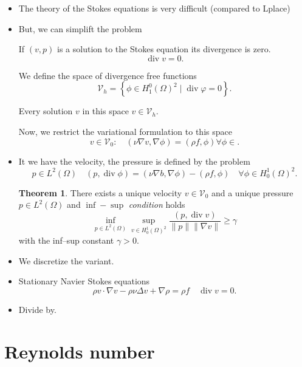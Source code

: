 \documentclass[
	a4paper,
	11pt,
	oneside
]{scrreprt}
\theoremstyle{definition}
\newtheorem{theorem}{Theorem}
\renewcommand{\div}{\operatorname{div}}
\begin{document}
\begin{itemize}
\item The theory of the Stokes equations is very difficult (compared to Lplace)%
\item But, we can simplift the problem

If $(v,p)$ is a solution to the Stokes equation its divergence is zero. \[ \div v=0. \]

We define the space of divergence free functions \[ \mathcal{V}_{h}=\left\{\phi\in H^{0}_{1}\left(\Omega\right)^{2}\mid\div\varphi=0\right\}. \]

Every solution $v$ in this space $v\in\mathcal{V}_{h}$.

Now, we restrict the variational formulation to this space \[ v\in\mathcal{V}_{0}\colon\quad\left(\nu\nabla v,\nabla\phi\right)=\left(\rho f,\phi\right)\forall\phi\in. \]
\end{itemize}

\begin{itemize}
	\item It we have the velocity, the pressure is defined by the problem \[p\in L^{2}\left(\Omega\right)\quad\left(p,\div\phi\right)=\left(\nu\nabla b,\nabla\phi\right)-\left(\rho f,\phi\right)\quad\forall\phi\in H^{1}_{0}\left(\Omega\right)^{2}. \]
	\begin{theorem}
		There exists a unique velocity $v\in\mathcal{V}_0$ and a unique pressure $p\in L^{2}\left(\Omega\right)$ and $\inf-\sup$ \textit{condition} holds \[ \inf_{p\in L^{2}\left(\Omega\right)}\sup_{v\in H^{1}_{0}\left(\Omega\right)^{2}}\frac{\left(p,\div v\right)}{\|p\|\|\nabla v\|}\ge\gamma \] with the inf--sup constant $\gamma>0$.
	\end{theorem}
\end{itemize}

\begin{itemize}
	\item We discretize the variant.
\end{itemize}

\begin{itemize}
	\item Stationary Navier Stokes equations \[ \rho v\cdot\nabla v-\rho\nu\Delta v+\nabla\rho=\rho f\quad\div v=0. \]
	\item Divide by.
\end{itemize}

\section{Reynolds number}
\end{document}
